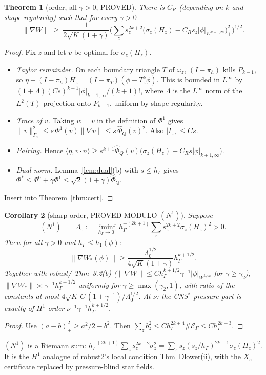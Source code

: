 \documentclass[11pt]{article}
\newtheorem{theorem}{Theorem}[section]
\newtheorem{corollary}[theorem]{Corollary}
\theoremstyle{remark}
\newcommand{\hG}{h_\Gamma}
\newcommand{\ip}[2]{\langle #1,#2\rangle}
\begin{document}
\begin{theorem}[order, all $\gamma>0$, PROVED]\label{thm:order}
There is $C_R$ (depending on $k$ and shape regularity) such that for every $\gamma>0$
\[
\|\nabla W\|\ \ge\ \frac{1}{2\sqrt K(1+\gamma)}\Big(\sum_z s_z^{2k+2}\big(\sigma_z(H_z)-C_Rs_z|\phi|_{W^{k+1,\infty}}\big)_+^2\Big)^{1/2}.
\]
\end{theorem}
\begin{proof}
Fix $z$ and let $v$ be optimal for $\sigma_z(H_z)$.
\begin{itemize}
\item \emph{Taylor remainder.} On each boundary triangle $T$ of $\omega_z$, $(I-\pi_h)$ kills $P_{k-1}$, so
$\eta-(I-\pi_h)H_z=(I-\pi_T)(\phi-T^k_z\phi)$. This is bounded in $L^\infty$ by $(1+\Lambda)(C s)^{k+1}|\phi|_{k+1,\infty}/(k+1)!$,
where $\Lambda$ is the $L^\infty$ norm of the $L^2(T)$ projection onto $P_{k-1}$, uniform by shape regularity.
\item \emph{Trace of $v$.} Taking $w=v$ in the definition of $\Phi^1$ gives $\|v\|^2_{\Gamma_\omega}\le s\,\Phi^1(v)\|\nabla v\|\le
s\,\hat\Phi_Q(v)^2$. Also $|\Gamma_\omega|\le Cs$.
\item \emph{Pairing.} Hence
$\ip{\eta}{v\cdot n}\ge s^{k+1}\hat\Phi_Q(v)\big(\sigma_z(H_z)-C_Rs|\phi|_{k+1,\infty}\big)$.
\item \emph{Dual norm.} Lemma~\ref{lem:dual}(b) with $s\le\hG$ gives
$\Phi^\ast\le\Phi^0+\gamma\Phi^1\le\sqrt2(1+\gamma)\hat\Phi_Q$.
\end{itemize}
Insert into Theorem~\ref{thm:cert}.
\end{proof}

\begin{corollary}[sharp order, PROVED MODULO $(N^1)$]\label{cor:order}
Suppose
\[
(N^1)\qquad \Lambda_0:=\liminf_{\hG\to0}\ \hG^{-(2k+1)}\sum_zs_z^{2k+2}\sigma_z(H_z)^2>0 .
\]
Then for all $\gamma>0$ and $\hG\le h_1(\phi)$:
\[
\|\nabla W_\ast(\phi)\|\ge\frac{\Lambda_0^{1/2}}{4\sqrt K(1+\gamma)}\hG^{k+1/2}.
\]
Together with robust/ Thm~3.2(b) ($\|\nabla W\|\le C\hG^{k+1/2}\gamma^{-1}|\phi|_{W^{k,\infty}}$ for
$\gamma\ge\gamma_2$), $\|\nabla W_\ast\|\asymp\gamma^{-1}\hG^{k+1/2}$ uniformly for $\gamma\ge\max(\gamma_2,1)$, with ratio of the
constants at most $4\sqrt K\,C\,(1+\gamma^{-1})/\Lambda_0^{1/2}$. At $\nu$: the CNS$^\ast$ pressure part is exactly of $H^1$ order
$\nu^{-1}\gamma^{-1}\hG^{k+1/2}$.
\end{corollary}
\begin{proof}
Use $(a-b)_+^2\ge a^2/2-b^2$. Then $\sum_zb_z^2\le C\hG^{2k+4}\#\mathcal E_\Gamma\le C\hG^{2k+3}$.
\end{proof}
$(N^1)$ is a Riemann sum: $\hG^{-(2k+1)}\sum_zs_z^{2k+2}\sigma_z^2=\sum_zs_z(s_z/\hG)^{2k+1}\sigma_z(H_z)^2$. It is the $H^1$
analogue of robust2's local condition Thm~Dlower(ii), with the $X_e$ certificate replaced by pressure-blind star fields.
\end{document}
